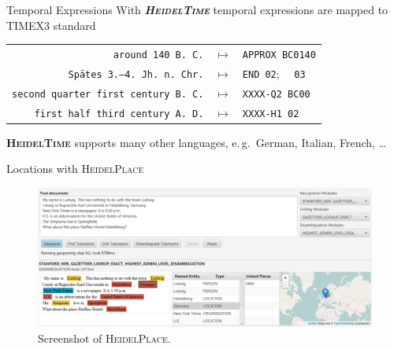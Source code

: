\documentclass[xcolor=x11names, aspectratio=169,usenames,dvipsnames]{beamer}
\begin{document}
\begin{frame}{Temporal Expressions}
With \textbf{\textit{\textsc{HeidelTime}}} temporal expressions are mapped to TIMEX3 standard
\begin{center}
{\renewcommand{\arraystretch}{1.2}%
\begin{tabular}{rcl}
\texttt{around 140 B.\,C.}&$\longmapsto$&\texttt{APPROX BC0140}\\
\texttt{Spätes 3.–4.\ Jh.\ n.\,Chr.}&$\longmapsto$&\texttt{END 02};~~ \texttt{03}\\
\texttt{second quarter first century B.\,C.}&$\longmapsto$&\texttt{XXXX-Q2 BC00}\\
\texttt{first half third century A.\,D.}&$\longmapsto$&\texttt{XXXX-H1 02}\\
\end{tabular}
}
\end{center}

\textbf{\textsc{HeidelTime}} supports many other languages, e.\,g.\ German, Italian, French, \dots
\end{frame}


\begin{frame}{Locations with \textsc{HeidelPlace}}
\begin{figure}
\hspace*{-1em}\includegraphics[width=1.025\textwidth]{img/heidelplace.png}
\caption{Screenshot of \textsc{HeidelPlace}.}
\end{figure}
\end{frame}
\end{document}

